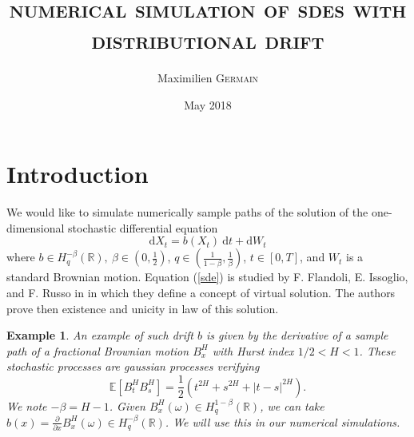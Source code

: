 \documentclass[11pt]{article}
\newcommand{\pade}[2]{\frac{\partial #1}{\partial #2}}
\newtheorem{ex}{Example}
\newcommand{\R}{\mathbb{R}}
\newcommand{\E}{\mathbb{E}}
\newcommand{\di}{\mathrm{d}}
\begin{document}
\title{\Large \textsc{\textbf{numerical simulation of sdes with distributional drift}}} \author{Maximilien \textsc{Germain} \date{May 2018}}
\maketitle

\section{Introduction}
    
    \paragraph{}
    We would like to simulate numerically sample paths of the solution of the one-dimensional stochastic differential equation
    \begin{equation} \label{sde}
    \di X_t = b(X_t)\ \di t + \di W_t
    \end{equation}
    where $b\in H^{-\beta}_q(\R),\ \beta\in\left(0,\frac{1}{2}\right)$, $q\in\left(\frac{1}{1-\beta},\frac{1}{\beta}\right)$, $t\in[0,T]$, and $W_t$ is a standard Brownian motion. Equation (\ref{sde}) is studied by F. Flandoli, E. Issoglio, and F. Russo in \cite{Fla-Iss-Rus-2017} in which they define a concept of virtual solution. The authors prove then existence and unicity in law of this solution. 
    
    \begin{ex}
        An example of such drift $b$ is given by the derivative of a sample path of a fractional Brownian motion $B^H_x$ with Hurst index $1/2<H<1$. These stochastic processes are gaussian processes verifying $$\E\left[B_t^HB_s^H\right]=\frac{1}{2}\left(t^{2H}+s^{2H}+|t-s|^{2H}\right).$$ We note $-\beta = H - 1$. Given $B^H_x(\omega)\in H^{1-\beta}_q(\R)$, we can take $b(x) = \pade{}{x}B^H_x(\omega)\in H^{-\beta}_q(\R)$. We will use this in our numerical simulations.
    \end{ex}    
    
\end{document}
